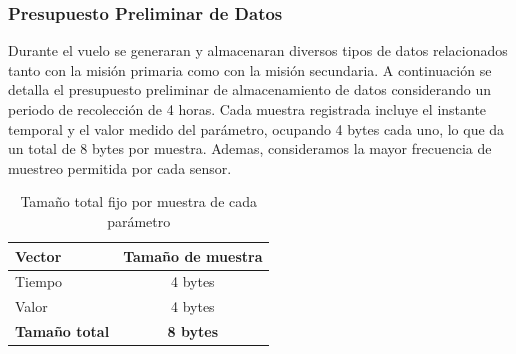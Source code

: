     \subsubsection{Presupuesto Preliminar de Datos}
      Durante el vuelo se generaran y almacenaran diversos tipos de datos relacionados tanto
      con la misión primaria como con la misión secundaria. A continuación se detalla el presupuesto preliminar de almacenamiento de datos considerando un periodo de recolección de 4
      horas.
      Cada muestra registrada incluye el instante temporal y el valor medido del parámetro, ocupando 4 bytes cada uno, lo que da un total de 8 bytes por muestra. Ademas, consideramos
      la mayor frecuencia de muestreo permitida por cada sensor.

      \begin{table}[H]
      \centering
      \begin{tabular}{|l|c|}
      \hline
      \textbf{Vector} & \textbf{Tamaño de muestra} \\
      \hline
      Tiempo & 4 bytes \\
      Valor  & 4 bytes \\
      \hline
      \textbf{Tamaño total} & \textbf{8 bytes} \\
      \hline
      \end{tabular}
      \caption{Tamaño total fijo por muestra de cada parámetro}
      \label{tab:tamanio_muestra}
      \end{table}

